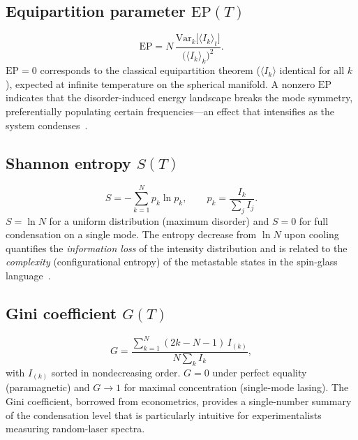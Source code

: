 \documentclass[11pt,a4paper]{article}
\newcommand{\avg}[1]{\langle #1 \rangle}
\begin{document}
\subsection{Equipartition parameter $\mathrm{EP}(T)$}
\begin{equation}
  \mathrm{EP}
  = N\,\frac{\mathrm{Var}_k\!\bigl[\avg{I_k}_t\bigr]}
            {\bigl(\avg{I_k}_k\bigr)^2}.
\end{equation}
$\mathrm{EP}=0$ corresponds to the classical equipartition
theorem ($\avg{I_k}$ identical for all $k$), expected at
infinite temperature on the spherical manifold.  A nonzero
$\mathrm{EP}$ indicates that the disorder-induced energy
landscape breaks the mode symmetry, preferentially populating
certain frequencies---an effect that intensifies as the system
condenses~\cite{Antenucci2015a}.

\subsection{Shannon entropy $S(T)$}
\begin{equation}
  S = -\sum_{k=1}^{N} p_k \ln p_k,
  \qquad
  p_k = \frac{I_k}{\sum_j I_j}.
\end{equation}
$S = \ln N$ for a uniform distribution (maximum disorder)
and $S = 0$ for full condensation on a single mode.
The entropy decrease from $\ln N$ upon cooling quantifies the
\emph{information loss} of the intensity distribution and
is related to the \emph{complexity} (configurational entropy)
of the metastable states in the spin-glass
language~\cite{MPV1987}.

\subsection{Gini coefficient $G(T)$}
\begin{equation}
  G = \frac{\sum_{k=1}^{N}(2k - N - 1)\,I_{(k)}}{N\sum_k I_k},
\end{equation}
with $I_{(k)}$ sorted in nondecreasing order.
$G=0$ under perfect equality (paramagnetic) and $G\to 1$ for
maximal concentration (single-mode lasing).
The Gini coefficient, borrowed from econometrics, provides a
single-number summary of the condensation level that is
particularly intuitive for experimentalists measuring
random-laser spectra.

\end{document}
